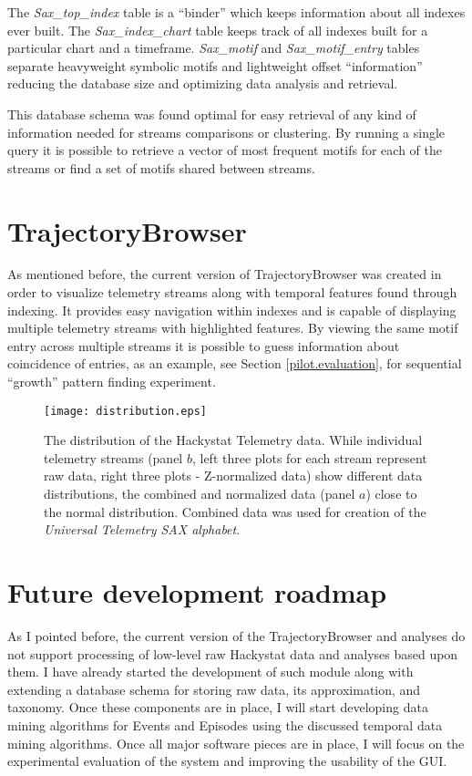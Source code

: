 The \textit{Sax\_top\_index} table is a ``binder'' which keeps information about all indexes ever built. The \textit{Sax\_index\_chart} table keeps track of all indexes built for a particular chart and a timeframe. \textit{Sax\_motif} and \textit{Sax\_motif\_entry} tables separate heavyweight symbolic motifs and lightweight offset ``information'' reducing the database size and optimizing data analysis and retrieval. 

This database schema was found optimal for easy retrieval of any kind of information needed for streams comparisons or clustering. By running a single query it is possible to retrieve a vector of most frequent motifs for each of the streams or find a set of motifs shared between streams.

\section{TrajectoryBrowser}
As mentioned before, the current version of TrajectoryBrowser was created in order to visualize telemetry streams along with temporal features found through indexing. It provides easy navigation within indexes and is capable of displaying multiple telemetry streams with highlighted features. By viewing the same motif entry across multiple streams it is possible to guess information about coincidence of entries, as an example, see Section \ref{pilot.evaluation}, for sequential ``growth'' pattern finding experiment.

\begin{figure}[tbp]
   \centering
   \texttt{[image: distribution.eps]}
   \caption{The distribution of the Hackystat Telemetry data. While individual telemetry streams (panel $b$, left three plots for each stream represent raw data, right three plots - Z-normalized data) show different data distributions, the combined and normalized data (panel $a$) close to the normal distribution. Combined data was used for creation of the \textit{Universal Telemetry SAX alphabet}.}
   \label{fig:distribution}
\end{figure}

\section{Future development roadmap}
As I pointed before, the current version of the TrajectoryBrowser and analyses do not support processing of low-level raw Hackystat data and analyses based upon them. I have already started the development of such module along with extending a database schema for storing raw data, its approximation, and taxonomy. Once these components are in place, I will start developing data mining algorithms for Events and Episodes using the discussed temporal data mining algorithms. Once all major software pieces are in place, I will focus on the experimental evaluation of the system and improving the usability of the GUI.